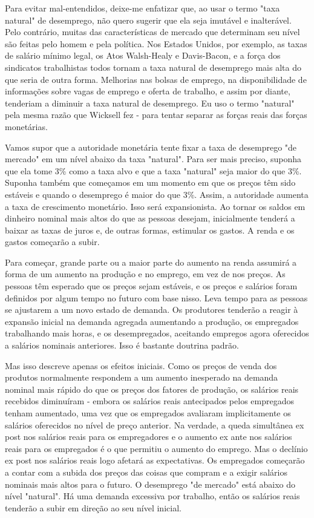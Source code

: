 \documentclass[12pt]{article}
\begin{document}
Para evitar mal-entendidos, deixe-me enfatizar que, ao usar o termo "taxa natural" de desemprego, não quero sugerir que ela seja imutável e inalterável. Pelo contrário, muitas das características de mercado que determinam seu nível são feitas pelo homem e pela política. Nos Estados Unidos, por exemplo, as taxas de salário mínimo legal, os Atos Walsh-Healy e Davis-Bacon, e a força dos sindicatos trabalhistas todos tornam a taxa natural de desemprego mais alta do que seria de outra forma. Melhorias nas bolsas de emprego, na disponibilidade de informações sobre vagas de emprego e oferta de trabalho, e assim por diante, tenderiam a diminuir a taxa natural de desemprego. Eu uso o termo "natural" pela mesma razão que Wicksell fez - para tentar separar as forças reais das forças monetárias.

Vamos supor que a autoridade monetária tente fixar a taxa de desemprego "de mercado" em um nível abaixo da taxa "natural". Para ser mais preciso, suponha que ela tome 3\% como a taxa alvo e que a taxa "natural" seja maior do que 3\%. Suponha também que começamos em um momento em que os preços têm sido estáveis e quando o desemprego é maior do que 3\%. Assim, a autoridade aumenta a taxa de crescimento monetário. Isso será expansionista. Ao tornar os saldos em dinheiro nominal mais altos do que as pessoas desejam, inicialmente tenderá a baixar as taxas de juros e, de outras formas, estimular os gastos. A renda e os gastos começarão a subir.

Para começar, grande parte ou a maior parte do aumento na renda assumirá a forma de um aumento na produção e no emprego, em vez de nos preços. As pessoas têm esperado que os preços sejam estáveis, e os preços e salários foram definidos por algum tempo no futuro com base nisso. Leva tempo para as pessoas se ajustarem a um novo estado de demanda. Os produtores tenderão a reagir à expansão inicial na demanda agregada aumentando a produção, os empregados trabalhando mais horas, e os desempregados, aceitando empregos agora oferecidos a salários nominais anteriores. Isso é bastante doutrina padrão.

Mas isso descreve apenas os efeitos iniciais. Como os preços de venda dos produtos normalmente respondem a um aumento inesperado na demanda nominal mais rápido do que os preços dos fatores de produção, os salários reais recebidos diminuíram - embora os salários reais antecipados pelos empregados tenham aumentado, uma vez que os empregados avaliaram implicitamente os salários oferecidos no nível de preço anterior. Na verdade, a queda simultânea ex post nos salários reais para os empregadores e o aumento ex ante nos salários reais para os empregados é o que permitiu o aumento do emprego. Mas o declínio ex post nos salários reais logo afetará as expectativas. Os empregados começarão a contar com a subida dos preços das coisas que compram e a exigir salários nominais mais altos para o futuro. O desemprego "de mercado" está abaixo do nível "natural". Há uma demanda excessiva por trabalho, então os salários reais tenderão a subir em direção ao seu nível inicial.
\end{document}
